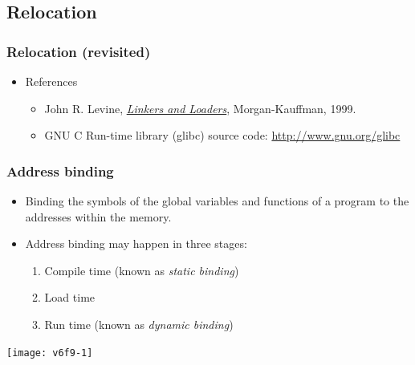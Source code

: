 \documentclass[CJKutf8,dvipsnames,table]{beamer}
\begin{document}
\begin{CJK*}{UTF8}{song}
  \subsection{Relocation}

  \begin{frame}
    \frametitle{Relocation (revisited)} \pause
    \begin{itemize}
    \item{References} \pause
      \begin{itemize}
      \item{John R. Levine, \href{http://linker.iecc.com}{\emph{Linkers and Loaders}}, Morgan-Kauffman, 1999.} \pause
      \item{GNU C Run-time library (glibc) source code: \url{http://www.gnu.org/glibc}}
      \end{itemize}
    \end{itemize}
  \end{frame}
  
  \begin{frame}
    \frametitle{Address binding} \pause
    \begin{minipage}[c]{0.6\textwidth}
      \begin{itemize}
      \item{Binding the symbols of the global variables and functions of a program to the addresses within the memory.} \pause
      \item{Address binding may happen in three stages:} \pause
        \begin{enumerate}
        \item{Compile time (known as \emph{static binding})} \pause
        \item{Load time} \pause
        \item{Run time (known as \emph{dynamic binding})} \pause
        \end{enumerate}
      \end{itemize}
    \end{minipage}%
    \begin{minipage}[c]{0.4\textwidth}
      \texttt{[image: v6f9-1]}
    \end{minipage}
  \end{frame}

  \iffalse


\end{CJK*}
\end{document}
